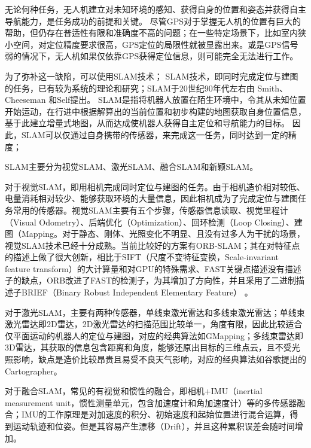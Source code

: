 无论何种任务，无人机建立对未知环境的感知、获得自身的位置和姿态并获得自主导航能力，是任务成功的前提和关键。
尽管GPS对于掌握无人机的位置有巨大的帮助，但仍存在普适性有限和准确度不高的问题；在一些特定场景下，比如室内狭小空间，对定位精度要求很高，GPS定位的局限性就被显露出来。或是GPS信号弱的情况下，无人机如果仅依靠GPS获得定位信息，则可能完全无法进行工作。

为了弥补这一缺陷，可以使用SLAM技术；
SLAM技术，即同时完成定位与建图的任务，已有较为系统的理论和研究；SLAM于20世纪90年代左右由 Smith、Cheeseman 和Self提出。
SLAM是指将机器人放置在陌生环境中，令其从未知位置开始运动，在行进中根据解算出的当前位置和初步构建的地图获取自身位置信息，基于此建立增量式地图，从而达成使机器人获得自主定位和导航能力的目标\cite{王晨捷2020无人机视觉}。
因此，SLAM可以仅通过自身携带的传感器，来完成这一任务，同时达到一定的精度；




SLAM主要分为视觉SLAM、激光SLAM、融合SLAM和新颖SLAM。


对于视觉SLAM，即用相机完成同时定位与建图的任务。由于相机造价相对较低、电量消耗相对较少、能够获取环境的大量信息，因此相机成为了完成定位与建图任务常用的传感器。视觉SLAM主要有五个步骤，传感器信息读取、视觉里程计（Visual Odometry）、后端优化（Optimization）、回环检测（Loop Closing）、建图（Mapping。对于静态、刚体、光照变化不明显、且没有过多人为干扰的场景，视觉SLAM技术已经十分成熟。当前比较好的方案有ORB-SLAM；其在对特征点的描述上做了很大创新，相比于SIFT（尺度不变特征变换，Scale-invariant feature transform）的大计算量和对GPU的特殊需求、FAST关键点描述没有描述子的缺点，ORB改进了FAST的检测子，为其增加了方向性，并且采用了二进制描述子BRIEF（Binary Robust Independent Elementary Feature） \cite{rublee2011orb}。


对于激光SLAM，主要有两种传感器，单线束激光雷达和多线束激光雷达；单线束激光雷达即2D雷达，2D激光雷达的扫描范围比较单一，角度有限，因此比较适合仅平面运动的机器人的定位与建图，对应的经典算法如GMapping；多线束雷达即3D雷达，其获取的信息包含距离和角度，能够还原出目标的三维点云，且不受光照影响，缺点是造价比较昂贵且易受不良天气影响\cite{杨明2000基于激光雷达的移动机器人环境建模与避障}，对应的经典算法如谷歌提出的Cartographer。


对于融合SLAM，常见的有视觉和惯性的融合，即相机+IMU（inertial measurement unit，惯性测量单元，包含加速度计和角加速度计）等的多传感器融合；IMU的工作原理是对加速度的积分、初始速度和起始位置进行混合运算，得到运动轨迹和位姿。但是其容易产生漂移（Drift），并且这种累积误差会随时间增加\cite{avrutov2017calibration}。


